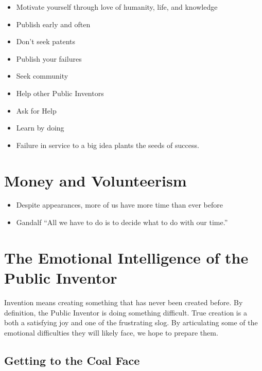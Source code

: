 \documentclass[
	fontsize=10pt, %
	twoside=false, %
	secnumdepth=1, %
]{kaobook}
\begin{document}

\begin{itemize}
\item Motivate yourself through love of humanity, life, and knowledge
\item Publish early and often
\item Don’t seek patents
\item Publish your failures
\item Seek community
\item Help other Public Inventors
\item Ask for Help
\item Learn by doing
\item Failure in service to a big idea plants the seeds of success.
\end{itemize}

\chapter{Money and Volunteerism}

\begin{itemize}
\item Despite appearances, more of us have more time than ever before
  \item Gandalf ``All we have to do is to decide what to do with our time.''
  \end{itemize}

\chapter{The Emotional Intelligence of the Public Inventor}

Invention means creating something that has never been
created before.
By definition, the Public Inventor is doing something
difficult.
True creation is a both a satisfying
joy and one of the frustrating slog.
By articulating some of the emotional difficulties
they will likely face, we hope to prepare them.

\section{Getting to the Coal Face}
\end{document}

